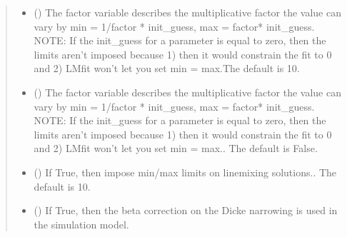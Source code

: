 \documentclass[letterpaper,10pt,english]{sphinxmanual}
\begin{document}
\begin{fulllineitems}
\begin{quote}
\begin{description}
\begin{itemize}
\item {} 
\sphinxAtStartPar
{} (\sphinxstyleliteralemphasis{\sphinxupquote{, }}) \textendash{} The factor variable describes the multiplicative factor the value can vary by min = 1/factor * init\_guess, max = factor* init\_guess. NOTE: If the init\_guess for a parameter is equal to zero, then the limits aren’t imposed because 1) then it would constrain the fit to 0 and 2) LMfit won’t let you set min = max.The default is 10.

\item {} 
\sphinxAtStartPar
{} (\sphinxstyleliteralemphasis{\sphinxupquote{, }}) \textendash{} The factor variable describes the multiplicative factor the value can vary by min = 1/factor * init\_guess, max = factor* init\_guess. NOTE: If the init\_guess for a parameter is equal to zero, then the limits aren’t imposed because 1) then it would constrain the fit to 0 and 2) LMfit won’t let you set min = max.. The default is False.

\item {} 
\sphinxAtStartPar
{} (\sphinxstyleliteralemphasis{\sphinxupquote{, }}) \textendash{} If True, then impose min/max limits on line\sphinxhyphen{}mixing solutions.. The default is 10.

\item {} 
\sphinxAtStartPar
{} (\sphinxstyleliteralemphasis{\sphinxupquote{, }}) \textendash{} If True, then the beta correction on the Dicke narrowing is used in the simulation model.

\end{itemize}

\end{description}\end{quote}


\end{fulllineitems}
\end{document}
